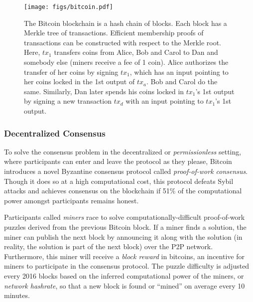 \begin{figure}[t]
    \centering
    \texttt{[image: figs/bitcoin.pdf]}
    \vspace{-1.5cm}
    \caption{The Bitcoin blockchain is a hash chain of blocks. Each block has a Merkle tree of transactions. Efficient membership proofs of transactions can be constructed with respect to the Merkle root. Here, $tx_1$ transfers coins from Alice, Bob and Carol to Dan and somebody else (miners receive a fee of 1 coin).
        Alice authorizes the transfer of her coins by signing $tx_1$, which has an input pointing to her coins locked in the 1st output of $tx_a$.
        Bob and Carol do the same.
        Similarly, Dan later spends his coins locked in $tx_1$'s 1st output by signing a new transaction $tx_d$ with an input pointing to $tx_1$'s 1st output.}
    \label{fig:bitcoin}
\end{figure}

\subsubsection{Decentralized Consensus}
\label{sec:background:bitcoin:consensus}
To solve the consensus problem in the decentralized or \emph{permissionless} setting, where participants can enter and leave the protocol as they please, Bitcoin introduces a novel Byzantine consensus protocol called \emph{proof-of-work consensus}\cite{blockchainproto,bitcoin-backbone,bitcoin-speed-security,miller2014anonymous}.
Though it does so at a high computational cost, this protocol defeats Sybil attacks\cite{sybil} and achieves consensus on the blockchain if 51\% of the computational power amongst participants remains honest.

Participants called \emph{miners} race to solve computationally-difficult proof-of-work puzzles derived from the previous Bitcoin block.
If a miner finds a solution, the miner can publish the next block by announcing it along with the solution (in reality, the solution is part of the next block) over the P2P network.
Furthermore, this miner will receive a \emph{block reward} in bitcoins, an incentive for miners to participate in the consensus protocol.
The puzzle difficulty is adjusted every 2016 blocks based on the inferred computational power of the miners, or \emph{network hashrate}, so that a new block is found or ``mined'' on average every 10 minutes.

